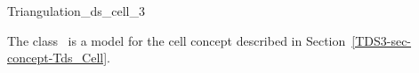 

\begin{ccRefClass}{Triangulation_ds_cell_3}  %


\ccDefinition
  
The class \ccRefName\ is a model for the
cell concept described in Section~\ref{TDS3-sec-concept-Tds_Cell}.


\ccIsModel


\ccSeeAlso




\end{ccRefClass}



